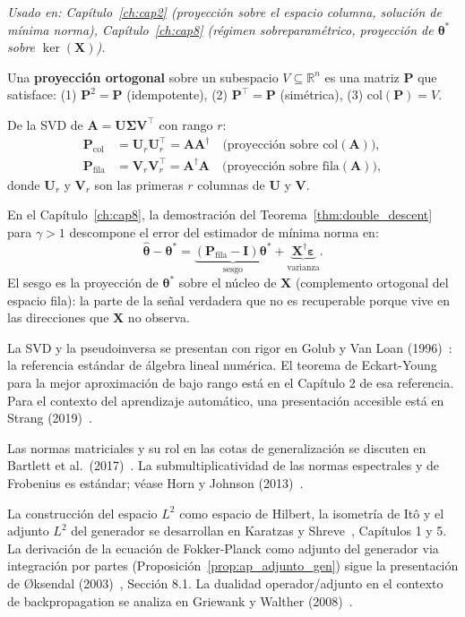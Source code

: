 \textit{Usado en: Capítulo~\ref{ch:cap2} (proyección sobre el espacio columna,
solución de mínima norma), Capítulo~\ref{ch:cap8} (régimen sobreparamétrico,
proyección de $\bm{\theta}^*$ sobre $\ker(\bm{X})$).}

\medskip
Una \textbf{proyección ortogonal} sobre un subespacio $V\subseteq\mathbb{R}^n$
es una matriz $\bm{P}$ que satisface: (1) $\bm{P}^2 = \bm{P}$ (idempotente),
(2) $\bm{P}^\top = \bm{P}$ (simétrica), (3) $\mathrm{col}(\bm{P}) = V$.

De la SVD de $\bm{A} = \bm{U}\bm{\Sigma}\bm{V}^\top$ con rango $r$:
\begin{align}
  \bm{P}_{\mathrm{col}} &= \bm{U}_r\bm{U}_r^\top = \bm{A}\bm{A}^\dagger
  \quad\text{(proyección sobre } \mathrm{col}(\bm{A})\text{)}, \\
  \bm{P}_{\mathrm{fila}} &= \bm{V}_r\bm{V}_r^\top = \bm{A}^\dagger\bm{A}
  \quad\text{(proyección sobre } \mathrm{fila}(\bm{A})\text{)},
\end{align}
donde $\bm{U}_r$ y $\bm{V}_r$ son las primeras $r$ columnas de $\bm{U}$ y
$\bm{V}$.

En el Capítulo~\ref{ch:cap8}, la demostración del Teorema~\ref{thm:double_descent}
para $\gamma > 1$ descompone el error del estimador de mínima norma en:
\[
  \hat{\bm{\theta}} - \bm{\theta}^*
  = \underbrace{(\bm{P}_{\mathrm{fila}}-\bm{I})\bm{\theta}^*}_{\text{sesgo}}
  + \underbrace{\bm{X}^\dagger\bm{\varepsilon}}_{\text{varianza}}.
\]
El sesgo es la proyección de $\bm{\theta}^*$ sobre el núcleo de $\bm{X}$
(complemento ortogonal del espacio fila): la parte de la señal verdadera que
no es recuperable porque vive en las direcciones que $\bm{X}$ no observa.

\begin{notasbib}
La SVD y la pseudoinversa se presentan con rigor en Golub y Van Loan
(1996)~\cite{golub1996matrix}: la referencia estándar de álgebra lineal numérica.
El teorema de Eckart-Young para la mejor aproximación de bajo rango está en el
Capítulo 2 de esa referencia. Para el contexto del aprendizaje automático, una
presentación accesible está en Strang (2019)~\cite{strang2019linear}.

Las normas matriciales y su rol en las cotas de generalización se discuten en
Bartlett et al.\ (2017)~\cite{bartlett2017spectrally}. La submultiplicatividad
de las normas espectrales y de Frobenius es estándar; véase Horn y Johnson
(2013)~\cite{horn2013matrix}.

La construcción del espacio $L^2$ como espacio de Hilbert, la isometría de Itô
y el adjunto $L^2$ del generador se desarrollan en Karatzas y
Shreve~\cite{karatzas1991brownian}, Capítulos 1 y 5. La derivación de la
ecuación de Fokker-Planck como adjunto del generador via integración por partes
(Proposición~\ref{prop:ap_adjunto_gen}) sigue la presentación de Øksendal
(2003)~\cite{oksendal2003stochastic}, Sección 8.1. La dualidad operador/adjunto
en el contexto de backpropagation se analiza en Griewank y Walther
(2008)~\cite{griewank2008evaluating}.
\end{notasbib}

\printbibliography[heading=subbibliography]